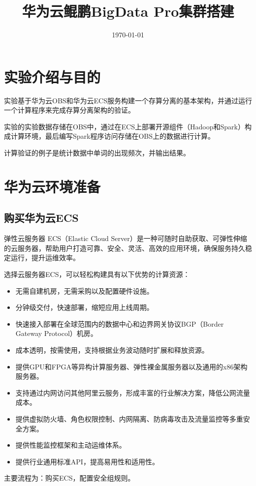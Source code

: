 \documentclass{../source/Experiment}
\title{华为云鲲鹏BigData Pro集群搭建
}
\date{\today}
\begin{document}
    \makecover
    \makeheader

    \section{实验介绍与目的}
        实验基于华为云OBS和华为云ECS服务构建一个存算分离的基本架构，并通过运行一个计算程序来完成存算分离架构的验证。
        
        实验的实验数据存储在OBS中，通过在ECS上部署开源组件（Hadoop和Spark）构成计算环境，最后编写Spark程序访问存储在OBS上的数据进行计算。

        计算验证的例子是统计数据中单词的出现频次，并输出结果。

    \section{华为云环境准备}
        \subsection{购买华为云ECS}
        弹性云服务器 ECS（Elastic Cloud Server）是一种可随时自助获取、可弹性伸缩的云服务器，帮助用户打造可靠、安全、灵活、高效的应用环境，确保服务持久稳定运行，提升运维效率。


        选择云服务器ECS，可以轻松构建具有以下优势的计算资源：
        \begin{itemize}
            \item 无需自建机房，无需采购以及配置硬件设施。
            \item 分钟级交付，快速部署，缩短应用上线周期。
            \item 快速接入部署在全球范围内的数据中心和边界网关协议BGP（Border Gateway Protocol）机房。
            \item 成本透明，按需使用，支持根据业务波动随时扩展和释放资源。
            \item 提供GPU和FPGA等异构计算服务器、弹性裸金属服务器以及通用的x86架构服务器。
            \item 支持通过内网访问其他阿里云服务，形成丰富的行业解决方案，降低公网流量成本。
            \item 提供虚拟防火墙、角色权限控制、内网隔离、防病毒攻击及流量监控等多重安全方案。
            \item 提供性能监控框架和主动运维体系。
            \item 提供行业通用标准API，提高易用性和适用性。
        \end{itemize}

        主要流程为：购买ECS，配置安全组规则。
\end{document}
